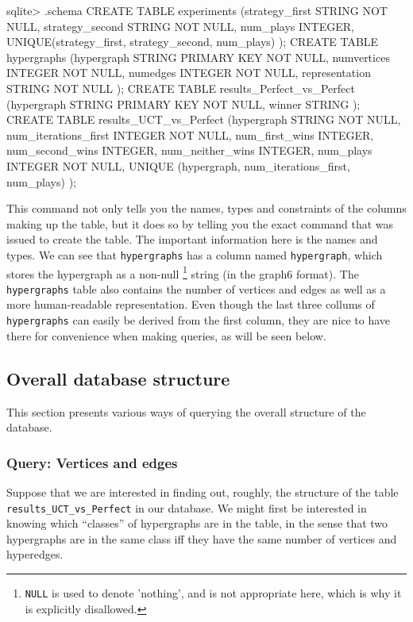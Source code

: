 \begin{minipage}{\linewidth}
\begin{code}
sqlite> .schema
CREATE TABLE experiments
(strategy_first STRING NOT NULL,
 strategy_second STRING NOT NULL,
 num_plays INTEGER,
 UNIQUE(strategy_first, strategy_second, num_plays)
);
CREATE TABLE hypergraphs
(hypergraph STRING PRIMARY KEY NOT NULL,
 numvertices INTEGER NOT NULL,
 numedges INTEGER NOT NULL,
 representation STRING NOT NULL
);
CREATE TABLE results_Perfect_vs_Perfect
(hypergraph STRING PRIMARY KEY NOT NULL,
 winner STRING
);
CREATE TABLE results_UCT_vs_Perfect
(hypergraph STRING NOT NULL,
 num_iterations_first INTEGER NOT NULL,
 num_first_wins INTEGER,
 num_second_wins INTEGER,
 num_neither_wins INTEGER,
 num_plays INTEGER NOT NULL,
 UNIQUE (hypergraph, num_iterations_first, num_plays)
);
\end{code}
\end{minipage}
This command not only tells you the names, types and constraints of the columns making up the table, but it does so by telling you the exact command that was issued to create the table.
The important information here is the names and types.
We can see that \texttt{hypergraphs} has a column named \texttt{hypergraph}, which stores the hypergraph as a non-null \footnote{\texttt{NULL} is used to denote 'nothing', and is not appropriate here, which is why it is explicitly disallowed.} string (in the graph6 format). 
The \texttt{hypergraphs} table also contains the number of vertices and edges as well as a more human-readable representation.
Even though the last three collums of \texttt{hypergraphs} can easily be derived from the first column, they are nice to have there for convenience when making queries, as will be seen below.


\subsection{Overall database structure}


This section presents various ways of querying the overall structure of the database.

\subsubsection{Query: Vertices and edges}

Suppose that we are interested in finding out, roughly, the structure of the table \texttt{results\_UCT\_vs\_Perfect} in our database.
We might first be interested in knowing which ``classes'' of hypergraphs are in the table, in the sense that two hypergraphs are in the same class iff they have the same number of vertices and hyperedges.

